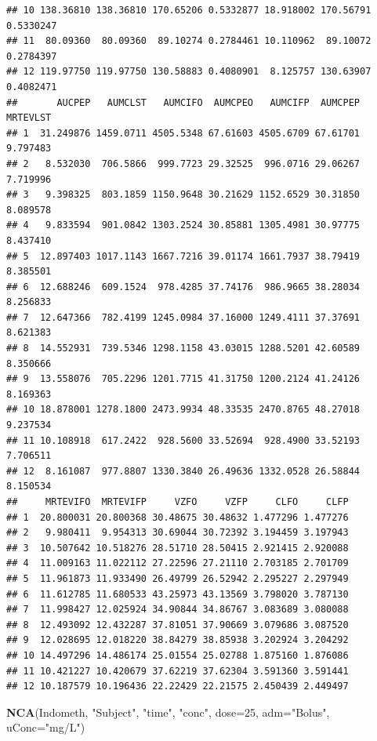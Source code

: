 \documentclass[]{krantz}
\makeatletter
\newenvironment{Shaded}{\begin{snugshade}}{\end{snugshade}}
\newcommand{\KeywordTok}[1]{\textcolor[rgb]{0.13,0.29,0.53}{\textbf{#1}}}
\newcommand{\DataTypeTok}[1]{\textcolor[rgb]{0.13,0.29,0.53}{#1}}
\newcommand{\DecValTok}[1]{\textcolor[rgb]{0.00,0.00,0.81}{#1}}
\newcommand{\StringTok}[1]{\textcolor[rgb]{0.31,0.60,0.02}{#1}}
\newcommand{\NormalTok}[1]{#1}
\newenvironment{kframe}{%
\medskip{}
\setlength{\fboxsep}{.8em}
 \def\at@end@of@kframe{}%
 \ifinner\ifhmode%
  \def\at@end@of@kframe{\end{minipage}}%
  \begin{minipage}{\columnwidth}%
 \fi\fi%
 \def\FrameCommand##1{\hskip\@totalleftmargin \hskip-\fboxsep
 \colorbox{shadecolor}{##1}\hskip-\fboxsep
     \hskip-\linewidth \hskip-\@totalleftmargin \hskip\columnwidth}%
 \MakeFramed {\advance\hsize-\width
   \@totalleftmargin\z@ \linewidth\hsize
   \@setminipage}}%
 {\par\unskip\endMakeFramed%
 \at@end@of@kframe}
\renewenvironment{Shaded}{\begin{kframe}}{\end{kframe}}
\theoremstyle{definition}
\theoremstyle{definition}
\theoremstyle{definition}
\theoremstyle{remark}
\makeatother
\begin{document}
\begin{verbatim}
## 10 138.36810 138.36810 170.65206 0.5332877 18.918002 170.56791 0.5330247
## 11  80.09360  80.09360  89.10274 0.2784461 10.110962  89.10072 0.2784397
## 12 119.97750 119.97750 130.58883 0.4080901  8.125757 130.63907 0.4082471
##       AUCPEP   AUMCLST   AUMCIFO  AUMCPEO   AUMCIFP  AUMCPEP MRTEVLST
## 1  31.249876 1459.0711 4505.5348 67.61603 4505.6709 67.61701 9.797483
## 2   8.532030  706.5866  999.7723 29.32525  996.0716 29.06267 7.719996
## 3   9.398325  803.1859 1150.9648 30.21629 1152.6529 30.31850 8.089578
## 4   9.833594  901.0842 1303.2524 30.85881 1305.4981 30.97775 8.437410
## 5  12.897403 1017.1143 1667.7216 39.01174 1661.7937 38.79419 8.385501
## 6  12.688246  609.1524  978.4285 37.74176  986.9665 38.28034 8.256833
## 7  12.647366  782.4199 1245.0984 37.16000 1249.4111 37.37691 8.621383
## 8  14.552931  739.5346 1298.1158 43.03015 1288.5201 42.60589 8.350666
## 9  13.558076  705.2296 1201.7715 41.31750 1200.2124 41.24126 8.169363
## 10 18.878001 1278.1800 2473.9934 48.33535 2470.8765 48.27018 9.237534
## 11 10.108918  617.2422  928.5600 33.52694  928.4900 33.52193 7.706511
## 12  8.161087  977.8807 1330.3840 26.49636 1332.0528 26.58844 8.150534
##     MRTEVIFO  MRTEVIFP     VZFO     VZFP     CLFO     CLFP
## 1  20.800031 20.800368 30.48675 30.48632 1.477296 1.477276
## 2   9.980411  9.954313 30.69044 30.72392 3.194459 3.197943
## 3  10.507642 10.518276 28.51710 28.50415 2.921415 2.920088
## 4  11.009163 11.022112 27.22596 27.21110 2.703185 2.701709
## 5  11.961873 11.933490 26.49799 26.52942 2.295227 2.297949
## 6  11.612785 11.680533 43.25973 43.13569 3.798020 3.787130
## 7  11.998427 12.025924 34.90844 34.86767 3.083689 3.080088
## 8  12.493092 12.432287 37.81051 37.90669 3.079686 3.087520
## 9  12.028695 12.018220 38.84279 38.85938 3.202924 3.204292
## 10 14.497296 14.486174 25.01554 25.02788 1.875160 1.876086
## 11 10.421227 10.420679 37.62219 37.62304 3.591360 3.591441
## 12 10.187579 10.196436 22.22429 22.21575 2.450439 2.449497
\end{verbatim}

\begin{Shaded}
\begin{Highlighting}[]
\KeywordTok{NCA}\NormalTok{(Indometh, }\StringTok{"Subject"}\NormalTok{, }\StringTok{"time"}\NormalTok{, }\StringTok{"conc"}\NormalTok{, }\DataTypeTok{dose=}\DecValTok{25}\NormalTok{, }\DataTypeTok{adm=}\StringTok{"Bolus"}\NormalTok{, }\DataTypeTok{uConc=}\StringTok{"mg/L"}\NormalTok{)}
\end{Highlighting}
\end{Shaded}
\end{document}
